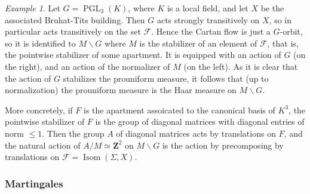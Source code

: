 \documentclass[a4paper, 11pt]{article}
\theoremstyle{plain}
\newtheorem{corollary}[proposition]{Corollary}
\theoremstyle{definition}
\theoremstyle{remark}
\newtheorem{example}[proposition]{Example}
\DeclareMathOperator{\PGL}{PGL}
\DeclareMathOperator{\Isom}{Isom}
\newcommand{\ZZ}{\mathbf{Z}}                          %
\DeclareMathOperator{\Prob}{Prob}
\newcommand{\scrF}{\mathscr F}
\newcommand{\pmop}{ {\pm,\mathrm{op}}}
\begin{document}
\begin{example}
Let $G=\PGL_3(K)$, where $K$ is a local field, and let $X$ be the associated Bruhat-Tits building. Then $G$ acts strongly transitively on $X$, so in particular acts transitively on the set $\scrF$. Hence the Cartan flow is just a $G$-orbit, so it is identified to $M\backslash G$ where $M$ is the stabilizer of an element of $\scrF$, that is, the pointwise stabilizer of some apartment. It is equipped with an action of $G$ (on the right), and an action of the normalizer of $M$ (on the left). As it is clear that the action of $G$ stabilizes the prouniform measure, it follows that (up to normalization) the prouniform measure is the Haar measure on $M\backslash G$.

More concretely, if $F$ is the apartment assoicated to the canonical basis of $K^3$, the pointwise stabilizer of $F$ is the group of diagonal matrices with diagonal entries of norm $\leq 1$. Then the group $A$ of diagonal matrices acts by translations on $F$, and the natural action of $A/M\simeq \ZZ^2$ on $M\backslash G$ is the action by precomposing by translations on $\scrF=\Isom(\Sigma,X)$.
\end{example}


%
% 


\subsubsection{Martingales}\label{sec:martingales}
\end{document}
